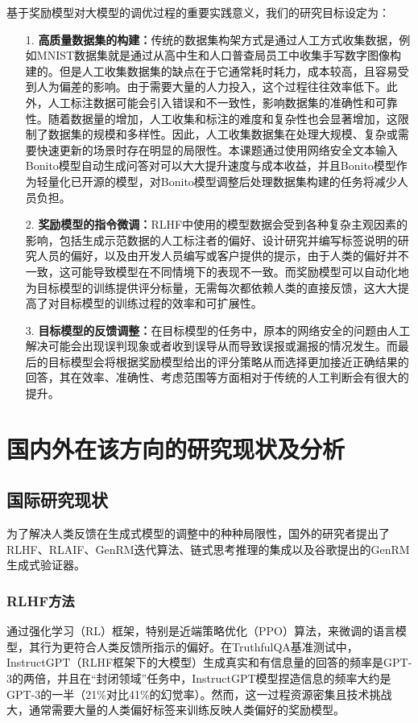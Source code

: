 基于奖励模型对大模型的调优过程的重要实践意义，我们的研究目标设定为：
\begin{itemize}
    \item[1.] \textbf{高质量数据集的构建：}传统的数据集构架方式是通过人工方式收集数据，例如MNIST数据集就是通过从高中生和人口普查局员工中收集手写数字图像构建的。但是人工收集数据集的缺点在于它通常耗时耗力，成本较高，且容易受到人为偏差的影响。由于需要大量的人力投入，这个过程往往效率低下。此外，人工标注数据可能会引入错误和不一致性，影响数据集的准确性和可靠性。随着数据量的增加，人工收集和标注的难度和复杂性也会显著增加，这限制了数据集的规模和多样性。因此，人工收集数据集在处理大规模、复杂或需要快速更新的场景时存在明显的局限性。本课题通过使用网络安全文本输入Bonito模型自动生成问答对可以大大提升速度与成本收益，并且Bonito模型作为轻量化已开源的模型，对Bonito模型调整后处理数据集构建的任务将减少人员负担。
    \item[2.] \textbf{奖励模型的指令微调：}RLHF中使用的模型数据会受到各种复杂主观因素的影响，包括生成示范数据的人工标注者的偏好、设计研究并编写标签说明的研究人员的偏好，以及由开发人员编写或客户提供的提示，由于人类的偏好并不一致，这可能导致模型在不同情境下的表现不一致。而奖励模型可以自动化地为目标模型的训练提供评分标量，无需每次都依赖人类的直接反馈，这大大提高了对目标模型的训练过程的效率和可扩展性。
    \item[3.] \textbf{目标模型的反馈调整：}在目标模型的任务中，原本的网络安全的问题由人工解决可能会出现误判现象或者收到误导从而导致误报或漏报的情况发生。而最后的目标模型会将根据奖励模型给出的评分策略从而选择更加接近正确结果的回答，其在效率、准确性、考虑范围等方面相对于传统的人工判断会有很大的提升。
\end{itemize}

\section{国内外在该方向的研究现状及分析}
\subsection{国际研究现状}
为了解决人类反馈在生成式模型的调整中的种种局限性，国外的研究者提出了RLHF、RLAIF、GenRM迭代算法、链式思考推理的集成以及谷歌提出的GenRM生成式验证器。
\subsubsection{RLHF方法}
通过强化学习（RL）框架，特别是近端策略优化（PPO）算法，来微调的语言模型，其行为更符合人类反馈所指示的偏好。在TruthfulQA基准测试中\cite{ouyang2022training}，InstructGPT（RLHF框架下的大模型）生成真实和有信息量的回答的频率是GPT-3的两倍，并且在“封闭领域”任务中，InstructGPT模型捏造信息的频率大约是GPT-3的一半（21\%对比41\%的幻觉率）。然而，这一过程资源密集且技术挑战大，通常需要大量的人类偏好标签来训练反映人类偏好的奖励模型。

